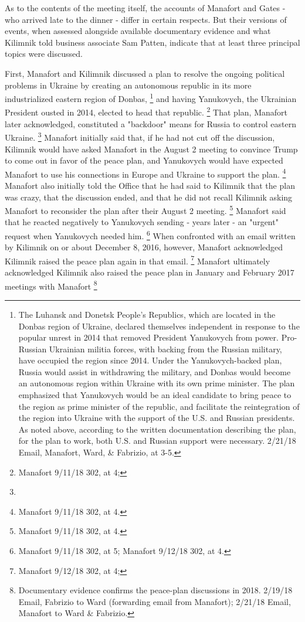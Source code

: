As to the contents of the meeting itself, the accounts of Manafort and Gates - who arrived late to the dinner - differ in certain respects.
But their versions of events, when assessed alongside available documentary evidence and what Kilimnik told business associate Sam Patten, indicate that at least three principal topics were discussed.

First, Manafort and Kilimnik discussed a plan to resolve the ongoing political problems in Ukraine by creating an autonomous republic in its more industrialized eastern region of Donbas,%
\footnote{The Luhansk and Donetsk People’s Republics, which are located in the Donbas region of Ukraine, declared themselves independent in response to the popular unrest in 2014 that removed President Yanukovych from power.
Pro-Russian Ukrainian militia forces, with backing from the Russian military, have occupied the region since 2014.
Under the Yanukovych-backed plan, Russia would assist in withdrawing the military, and Donbas would become an autonomous region within Ukraine with its own prime minister.
The plan emphasized that Yanukovych would be an ideal candidate to bring peace to the region as prime minister of the republic, and facilitate the reintegration of the region into Ukraine with the support of the U.S. and Russian presidents.
As noted above, according to  the written documentation describing the plan, for the plan to work, both U.S. and Russian support were necessary.
 2/21/18 Email, Manafort, Ward, \& Fabrizio, at 3-5.}
and having Yanukovych, the Ukrainian President ousted in 2014, elected to head that republic.%
\footnote{Manafort 9/11/18 302, at 4; }
That plan, Manafort later acknowledged, constituted a "backdoor" means for Russia to control eastern Ukraine.%
\footnote{}
Manafort initially said that, if he had not cut off the discussion, Kilimnik would have asked Manafort in the August 2 meeting to convince Trump to come out in favor of the peace plan, and Yanukovych would have expected Manafort to use his connections in Europe and Ukraine to support the plan.%
\footnote{Manafort 9/11/18 302, at 4.}
Manafort also initially told the Office that he had said to Kilimnik that the plan was crazy, that the discussion ended, and that he did not recall Kilimnik asking Manafort to reconsider the plan after their August 2 meeting.%
\footnote{Manafort 9/11/18 302, at 4.}
Manafort said
that he reacted negatively to Yanukovych sending - years later - an "urgent" request when Yanukovych needed him.%
\footnote{ Manafort 9/11/18 302, at 5;
Manafort 9/12/18 302, at 4.}
When confronted with an email written by Kilimnik on or about December 8, 2016, however, Manafort acknowledged Kilimnik raised the peace plan again in that email.%
\footnote{Manafort 9/12/18 302, at 4; }
Manafort ultimately acknowledged Kilimnik also raised the peace plan in January and February 2017 meetings with Manafort
\footnote{ Documentary evidence confirms the peace-plan discussions in 2018.
2/19/18 Email, Fabrizio to Ward (forwarding email from Manafort);
2/21/18 Email, Manafort to Ward \& Fabrizio.}

